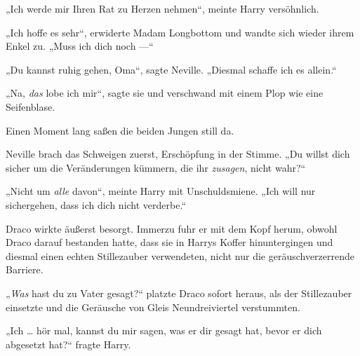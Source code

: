 „Ich werde mir Ihren Rat zu Herzen nehmen“, meinte Harry versöhnlich.

„Ich hoffe es sehr“, erwiderte Madam Longbottom und wandte sich wieder ihrem Enkel zu.
„Muss ich dich noch —“

„Du kannst ruhig gehen, Oma“, sagte Neville.
„Diesmal schaffe ich es allein.“

„Na, \emph{das} lobe ich mir“, sagte sie und verschwand mit einem Plop wie eine Seifenblase.

Einen Moment lang saßen die beiden Jungen still da.

Neville brach das Schweigen zuerst, Erschöpfung in der Stimme.
„Du willst dich sicher um die Veränderungen kümmern, die ihr \emph{zusagen}, nicht wahr?“

„Nicht um \emph{alle} davon“, meinte Harry mit Unschuldsmiene.
„Ich will nur sichergehen, dass ich dich nicht verderbe.“

\later

Draco wirkte äußerst besorgt. Immerzu fuhr er mit dem Kopf herum, obwohl Draco darauf bestanden hatte, dass sie in Harrys Koffer hinuntergingen und diesmal einen echten Stillezauber verwendeten, nicht nur die geräuschverzerrende Barriere.

„\emph{Was} hast du zu Vater gesagt?“ platzte Draco sofort heraus, als der Stillezauber einsetzte und die Geräusche von Gleis Neundreiviertel verstummten.

„Ich … hör mal, kannst du mir sagen, was er dir gesagt hat, bevor er dich abgesetzt hat?“ fragte Harry.

